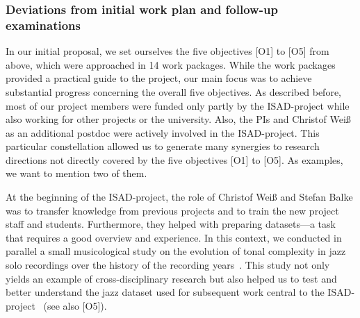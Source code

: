 \documentclass[11pt,a4paper]{article}
\def\PN{\mathrm{ISAD}}
\theoremstyle{plain} \newtheorem{define}{Definition}[section]
\begin{document}
{%

\subsubsection*{Deviations from initial work plan and follow-up examinations}

In our initial proposal, we set ourselves the five objectives [O1] to [O5] from above, which were approached in 14 work packages. While the work packages provided a practical guide to the project, our main focus was to achieve substantial progress concerning the overall five objectives. As described before, most of our project members were funded only partly by the $\PN$-project while also working for other projects or the university. Also, the PIs and Christof Wei{\ss} as an additional postdoc were actively involved in the $\PN$-project. This particular constellation allowed us to generate many synergies to research directions not directly covered by the five objectives [O1] to [O5]. As examples, we want to mention two of them. 

At the beginning of the $\PN$-project, the role of Christof Wei{\ss} and Stefan Balke was to transfer knowledge from previous projects and to train the new project staff and students. Furthermore, they helped with preparing datasets---a task that requires a good overview and experience. In this context, we conducted in parallel a small musicological study on the evolution of tonal complexity in jazz solo recordings over the history of the recording years~\cite{WeissBAM18_JazzComplexity_ISMIR}. This study not only yields an example of cross-disciplinary research but also helped us to test and better understand the jazz dataset used for subsequent work central to the $\PN$-project~\cite{AbesserBM18_BassSaliency_ISMIR,
AbesserMueller19_ContourClassification_ICASSP,
Reck19_StructureBoundary_MasterThesis,
WeissBAM18_JazzComplexity_ISMIR}  (see also [O5]).

}
\end{document}
